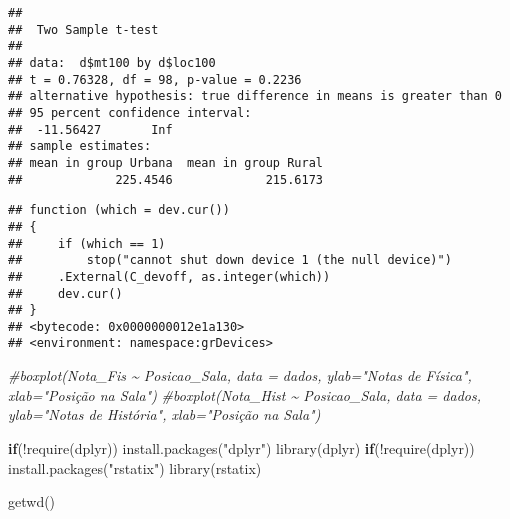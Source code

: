 \documentclass[
]{article}
\newenvironment{Shaded}{\begin{snugshade}}{\end{snugshade}}
\newcommand{\AttributeTok}[1]{\textcolor[rgb]{0.77,0.63,0.00}{#1}}
\newcommand{\CommentTok}[1]{\textcolor[rgb]{0.56,0.35,0.01}{\textit{#1}}}
\newcommand{\ControlFlowTok}[1]{\textcolor[rgb]{0.13,0.29,0.53}{\textbf{#1}}}
\newcommand{\FunctionTok}[1]{\textcolor[rgb]{0.00,0.00,0.00}{#1}}
\newcommand{\NormalTok}[1]{#1}
\newcommand{\SpecialCharTok}[1]{\textcolor[rgb]{0.00,0.00,0.00}{#1}}
\newcommand{\StringTok}[1]{\textcolor[rgb]{0.31,0.60,0.02}{#1}}
\begin{document}
\begin{verbatim}
## 
##  Two Sample t-test
## 
## data:  d$mt100 by d$loc100
## t = 0.76328, df = 98, p-value = 0.2236
## alternative hypothesis: true difference in means is greater than 0
## 95 percent confidence interval:
##  -11.56427       Inf
## sample estimates:
## mean in group Urbana  mean in group Rural 
##             225.4546             215.6173
\end{verbatim}

\begin{Shaded}
\end{Shaded}

\begin{verbatim}
## function (which = dev.cur()) 
## {
##     if (which == 1) 
##         stop("cannot shut down device 1 (the null device)")
##     .External(C_devoff, as.integer(which))
##     dev.cur()
## }
## <bytecode: 0x0000000012e1a130>
## <environment: namespace:grDevices>
\end{verbatim}

\begin{Shaded}
\begin{Highlighting}[]
\CommentTok{\#boxplot(Nota\_Fis \textasciitilde{} Posicao\_Sala, data = dados, ylab="Notas de Física", xlab="Posição na Sala")}
\CommentTok{\#boxplot(Nota\_Hist \textasciitilde{} Posicao\_Sala, data = dados, ylab="Notas de História", xlab="Posição na Sala")}
\end{Highlighting}
\end{Shaded}

\begin{Shaded}
\begin{Highlighting}[]
\ControlFlowTok{if}\NormalTok{(}\SpecialCharTok{!}\FunctionTok{require}\NormalTok{(dplyr)) }\FunctionTok{install.packages}\NormalTok{(}\StringTok{"dplyr"}\NormalTok{) }
\FunctionTok{library}\NormalTok{(dplyr)                                }
\ControlFlowTok{if}\NormalTok{(}\SpecialCharTok{!}\FunctionTok{require}\NormalTok{(dplyr)) }\FunctionTok{install.packages}\NormalTok{(}\StringTok{"rstatix"}\NormalTok{) }
\FunctionTok{library}\NormalTok{(rstatix)}


\FunctionTok{getwd}\NormalTok{() }
\end{Highlighting}
\end{Shaded}
\end{document}
